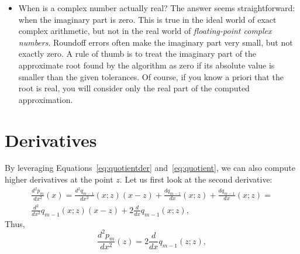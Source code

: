 \documentclass[10pt,a4paper]{article}
\theoremstyle{definition}%
\begin{document}
\begin{itemize}
    $x_0$ with non-zero imaginary part, unless you already know that \emph{all} zeros are real or, at least, that you know how many real zeros there are, since the given algorithm allows one to search only for a prescribed number of zeros.
    \item When is a complex number actually real? The answer seems straightforward: when the imaginary part is zero. This is true in the ideal world of exact complex arithmetic, but not in the real world of \emph{floating-point complex numbers}. Roundoff errors
    often make the imaginary part very small, but not exactly zero. A rule of thumb is to treat the imaginary part of the approximate root found by the algorithm as zero if its absolute value is smaller than the given tolerances. Of course, if you know a priori that the root is real, you will consider only the real part of the computed approximation.
\end{itemize}


\section{Derivatives}
By leveraging Equations~\eqref{eq:quotientder} and~\eqref{eq:quotient}, we can also compute higher derivatives at the point $z$. Let us first look at the second derivative:
\begin{multline}\label{eq:secderexp}
\frac{d^2p_m}{dx^2}(x)=\frac{d^2q_{m-1}}{dx^2}(x;z)(x-z) + \frac{dq_{m-1}}{dx} (x;z) + \frac{dq_{m-1}}{dx} (x;z)=\\ \frac{d^2}{dx^2}q_{m-1}(x;z)(x-z) + 2 \frac{d}{dx} q_{m-1}(x;z),
\end{multline}
Thus,
\begin{equation}\label{eq:secder}
\frac{d^2p_m}{dx^2}(z)=2 \frac{d}{dx} q_{m-1}(z;z),
\end{equation}
\end{document}
